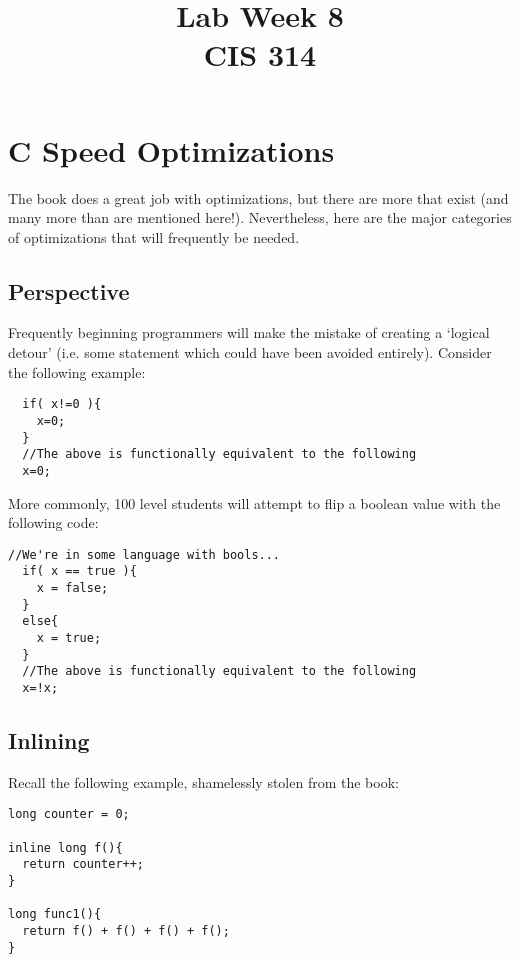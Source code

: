 \documentclass[10pt]{article}
\renewcommand{\#}{\raisebox{.22ex}{\large\old}}
\begin{document}
\title{Lab Week \#8 \\
	CIS 314}
\author{}

\maketitle

\section{C Speed Optimizations}

The book does a great job with optimizations, but there are more that exist (and many more than are mentioned here!). Nevertheless, here are the major categories of optimizations that will frequently be needed.

\subsection{Perspective}

Frequently beginning programmers will make the mistake of creating a `logical detour' (i.e. some statement which could have been avoided entirely). Consider the following example:


\begin{lstlisting}
  if( x!=0 ){
    x=0;
  }
  //The above is functionally equivalent to the following
  x=0;
\end{lstlisting}

\noindent More commonly, 100 level students will attempt to flip a boolean value with the following code:

\begin{lstlisting}
//We're in some language with bools...
  if( x == true ){
    x = false;
  }
  else{
    x = true;
  }
  //The above is functionally equivalent to the following
  x=!x;
\end{lstlisting}


\subsection{Inlining}
Recall the following example, shamelessly stolen from the book:

\begin{lstlisting}
long counter = 0;

inline long f(){
  return counter++;
}

long func1(){
  return f() + f() + f() + f();
}
\end{lstlisting}
\end{document}
